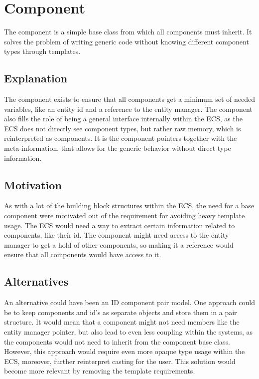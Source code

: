 \section{Component}
\label{subsec:detailed_component}
The component is a simple base class from which all components must inherit.
It solves the problem of writing generic code without knowing different component types through templates.

\subsection{Explanation}
The component exists to ensure that all components get a minimum set of needed
variables, like an entity id and a reference to the entity manager.
The component also fills the role of being a general interface internally within the ECS, as the ECS does not directly see component types, but rather raw memory, which is reinterpreted as components.
It is the component pointers together with the meta-information,
that allows for the generic behavior without direct type information.

\subsection{Motivation}
As with a lot of the building block structures within the ECS, the need for a base component
were motivated out of the requirement for avoiding heavy template usage.
The ECS would need a way to extract certain information related to components,
like their id. The component might need access to the entity manager
to get a hold of other components, so making it a reference
would ensure that all components would have access to it.

\subsection{Alternatives}
An alternative could have been an ID component pair model.
One approach could be to keep components and id's as separate objects and store them in a pair structure.
It would mean that a component might not need members like the entity manager pointer, but also lead to even less coupling within the systems, as the components would not need to inherit from the component base class.
However, this approach would require even more opaque type usage within the ECS,
moreover, further reinterpret casting for the user.
This solution would become more relevant by removing the template requirements.

